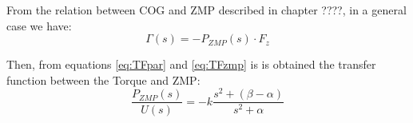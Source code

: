 From the relation between COG and ZMP described in chapter ????, in a general case we have:
\begin{equation}
\Gamma(s) = -P_{ZMP}(s) \cdot F_z
\label{eq:TFzmp}
\end{equation}

Then, from equations \ref{eq:TFpar} and \ref{eq:TFzmp} is is obtained the transfer function between the Torque and ZMP:
\begin{equation}
\frac{P_{ZMP}(s)}{U(s)} = -k \frac{s^2+(\beta - \alpha)}{s^2 + \alpha}
\end{equation} 